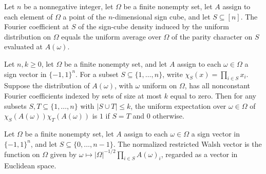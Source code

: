 \begin{theorem}
\label{FABL.fourierCoeff_signMultisetDensity}
\leanok
{}
Let $n$ be a nonnegative integer, let $\Omega$ be a finite nonempty set, let $A$ assign
to each element of $\Omega$ a point of the $n$-dimensional sign cube, and let
$S\subseteq[n]$. The Fourier coefficient at $S$ of the sign-cube density induced by the
uniform distribution on $\Omega$ equals the uniform average over $\Omega$ of the parity
character on $S$ evaluated at $A(\omega)$.
\end{theorem}

\begin{theorem}
\label{FABL.IsKWiseIndependentMultiset.expect_monomial_mul}
\leanok
{}
Let $n,k\ge0$, let $\Omega$ be a finite nonempty set, and let $A$ assign to each
$\omega\in\Omega$ a sign vector in $\{-1,1\}^n$. For a subset
$S\subseteq\{1,\ldots,n\}$, write $\chi_S(x)=\prod_{i\in S}x_i$. Suppose the
distribution of $A(\omega)$, with $\omega$ uniform on $\Omega$, has all nonconstant
Fourier coefficients indexed by sets of size at most $k$ equal to zero. Then for any
subsets $S,T\subseteq\{1,\ldots,n\}$ with $|S\cup T|\le k$, the uniform expectation over
$\omega\in\Omega$ of $\chi_S(A(\omega))\chi_T(A(\omega))$ is $1$ if $S=T$ and $0$
otherwise.
\end{theorem}

\begin{definition}
\label{FABL.normalizedRestrictedWalshVector}
\leanok
{}
Let $\Omega$ be a finite nonempty set, let $A$ assign to each $\omega\in\Omega$ a sign
vector in $\{ -1,1\}^n$, and let $S\subseteq\{0,\ldots,n-1\}$. The normalized restricted
Walsh vector is the function on $\Omega$ given by $\omega\mapsto
|\Omega|^{-1/2}\prod_{i\in S}A(\omega)_i$, regarded as a vector in Euclidean space.
\end{definition}

